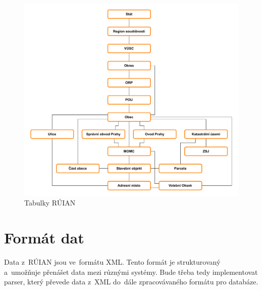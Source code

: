\begin{figure}[!h]
    \centering
    \includegraphics[width=\textwidth]{figures/ruian_diagram.pdf}
    \caption{Tabulky RÚIAN}
    \label{fig:ruian_tables}
\end{figure}

\section{Formát dat}
Data z~RÚIAN jsou ve~formátu XML. Tento formát je strukturovaný a~umožňuje
přenášet data mezi různými systémy. Bude třeba tedy implementovat parser,
který převede data z~XML do~dále zpracovávaného formátu pro databáze.
